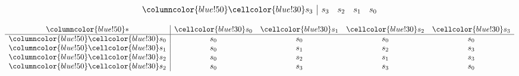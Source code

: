 \documentclass{article}
\begin{document}
\begin{center}
\begin{minipage}{0.23\textwidth}
\[\begin{array}{>{\columncolor{blue!50}}c|cccc}
    \cellcolor{blue!30}s_3 & s_3 & s_2 & s_1 & s_0 \\
    \end{array}
    \]
\end{minipage}%
\hfill
\begin{minipage}{0.23\textwidth}
    \centering
    \renewcommand{\arraystretch}{1.5} 
    \[
    \begin{array}{>{\columncolor{blue!50}}c|cccc}
    * & \cellcolor{blue!30}s_0 & \cellcolor{blue!30}s_1 & \cellcolor{blue!30}s_2 & \cellcolor{blue!30}s_3 \\ \hline
    \cellcolor{blue!30}s_0 & s_0 & s_0 & s_0 & s_0 \\
    \cellcolor{blue!30}s_1 & s_0 & s_1 & s_2 & s_3 \\
    \cellcolor{blue!30}s_2 & s_0 & s_2 & s_1 & s_3 \\
    \cellcolor{blue!30}s_2 & s_0 & s_3 & s_3 & s_0 \\
    \end{array}
    \]
\end{minipage}


\end{center}
\end{document}
